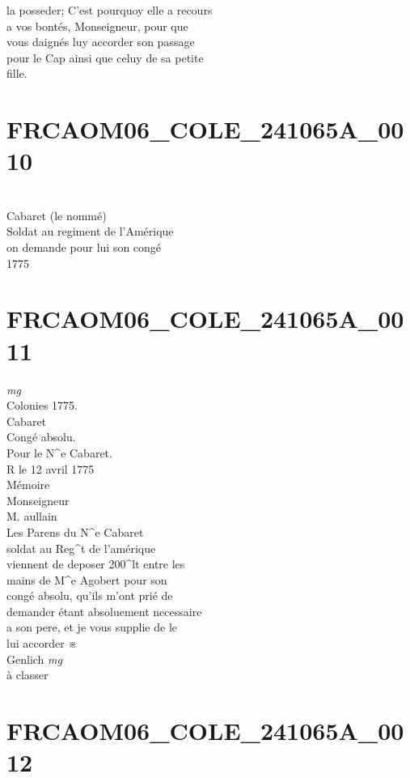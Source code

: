 \documentclass{article}
\begin{document}
\begin{pages}
la posseder; C'est pourquoy elle a recours\\
a vos bontés, Monseigneur, pour que\\
vous daignés luy accorder son passage\\
pour le Cap ainsi que celuy de sa petite\\
fille.
\pend
\endnumbering\beginnumbering\section{FRCAOM06\_COLE\_241065A\_0010}\pstart
\\
Cabaret (le nommé)\\
Soldat au regiment de l'Amérique\\
on demande pour lui son congé\\
1775
\pend
\endnumbering\beginnumbering\section{FRCAOM06\_COLE\_241065A\_0011}
\vspace{0.5cm}\noindent
\textit{mg}
\footnotesize \\
Colonies 1775.\\
Cabaret\\
Congé absolu.\\
Pour le N\^{}e Cabaret.\\
R le 12 avril 1775
\normalsize \pstart
\\
Mémoire\\
Monseigneur\\
M. aullain\\
Les Parens du N\^{}e Cabaret\\
soldat au Reg\^{}t de l'amérique\\
viennent de deposer 200\^{}lt entre les\\
mains de M\^{}e Agobert pour son\\
congé absolu, qu'ils m'ont prié de\\
demander étant absoluement necessaire\\
a son pere, et je vous supplie de le\\
lui accorder ※\\
Genlich
\pend
\vspace{0.5cm}\noindent
\textit{mg}
\footnotesize \\
à classer
\normalsize 
\endnumbering\beginnumbering\section{FRCAOM06\_COLE\_241065A\_0012}

\end{pages}
\end{document}
